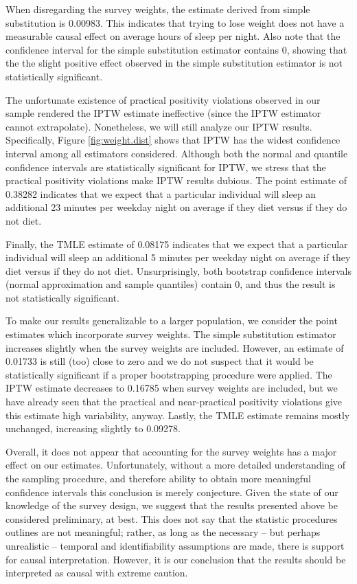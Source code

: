 \documentclass{article}
\begin{document}
When disregarding the survey weights, the estimate derived from simple substitution is 0.00983. This indicates that trying to lose weight does not have a measurable causal effect on average hours of sleep per night. Also note that the confidence interval for the simple substitution estimator contains $0$, showing that the the slight positive effect observed in the simple substitution estimator is not statistically significant.

The unfortunate existence of practical positivity violations observed in our sample rendered the IPTW estimate ineffective (since the IPTW estimator cannot extrapolate). Nonetheless, we will still analyze our IPTW results. Specifically, Figure \ref{fig:weight.dist} shows that IPTW has the widest confidence interval among all estimators considered. Although both the normal and quantile confidence intervals are statistically significant for IPTW, we stress that the practical positivity violations make IPTW results dubious. The point estimate of 0.38282 indicates that we expect that a particular individual will sleep an additional 23 minutes per weekday night on average if they diet versus if they do not diet.

Finally, the TMLE estimate of 0.08175 indicates that we expect that a particular individual will sleep an additional 5 minutes per weekday night on average if they diet versus if they do not diet. Unsurprisingly, both bootstrap confidence intervals (normal approximation and sample quantiles) contain $0$, and thus the result is not statistically significant.

To make our results generalizable to a larger population, we consider the point estimates which incorporate survey weights. The simple substitution estimator increases slightly when the survey weights are included. However, an estimate of 0.01733 is still (too) close to zero and we do not suspect that it would be statistically significant if a proper bootstrapping procedure were applied. The IPTW estimate decreases to 0.16785 when survey weights are included, but we have already seen that the practical and near-practical positivity violations give this estimate high variability, anyway. Lastly, the TMLE estimate remains mostly unchanged, increasing slightly to 0.09278. 

Overall, it does not appear that accounting for the survey weights has a major effect on our estimates. Unfortunately, without a more detailed understanding of the sampling procedure, and therefore ability to obtain more meaningful confidence intervals this conclusion is merely conjecture. Given the state of our knowledge of the survey design, we suggest that the results presented above be considered preliminary, at best. This does not say that the statistic procedures outlines are not meaningful; rather, as long as the necessary -- but perhaps unrealistic -- temporal and identifiability assumptions are made, there is support for causal interpretation. However, it is our conclusion that the results should be interpreted as causal with extreme caution.
\end{document}

